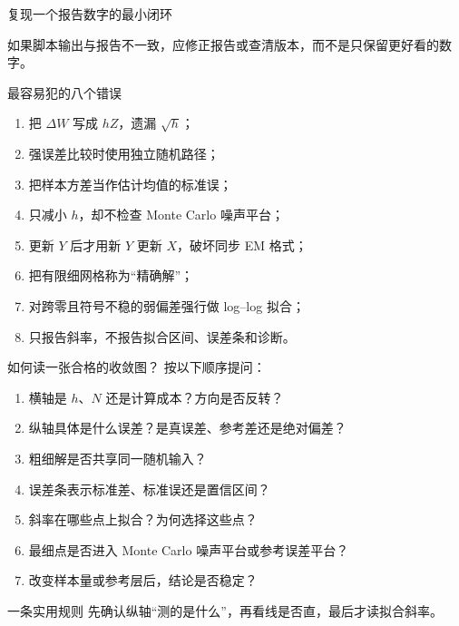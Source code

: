 \documentclass[aspectratio=169,10pt,fontset=none]{ctexbeamer}
\begin{document}
\begin{frame}{复现一个报告数字的最小闭环}
  \centering
  \vspace{0.6em}

  如果脚本输出与报告不一致，应修正报告或查清版本，而不是只保留更好看的数字。
\end{frame}

\begin{frame}{最容易犯的八个错误}
  \begin{enumerate}
    \item 把 $\Delta W$ 写成 $hZ$，遗漏 $\sqrt h$；
    \item 强误差比较时使用独立随机路径；
    \item 把样本方差当作估计均值的标准误；
    \item 只减小 $h$，却不检查 Monte Carlo 噪声平台；
    \item 更新 $Y$ 后才用新 $Y$ 更新 $X$，破坏同步 EM 格式；
    \item 把有限细网格称为“精确解”；
    \item 对跨零且符号不稳的弱偏差强行做 log--log 拟合；
    \item 只报告斜率，不报告拟合区间、误差条和诊断。
  \end{enumerate}
\end{frame}

\begin{frame}{如何读一张合格的收敛图？}
  按以下顺序提问：
  \begin{enumerate}
    \item 横轴是 $h$、$N$ 还是计算成本？方向是否反转？
    \item 纵轴具体是什么误差？是真误差、参考差还是绝对偏差？
    \item 粗细解是否共享同一随机输入？
    \item 误差条表示标准差、标准误还是置信区间？
    \item 斜率在哪些点上拟合？为何选择这些点？
    \item 最细点是否进入 Monte Carlo 噪声平台或参考误差平台？
    \item 改变样本量或参考层后，结论是否稳定？
  \end{enumerate}
  \begin{alertblock}{一条实用规则}
    先确认纵轴“测的是什么”，再看线是否直，最后才读拟合斜率。
  \end{alertblock}
\end{frame}
\end{document}

